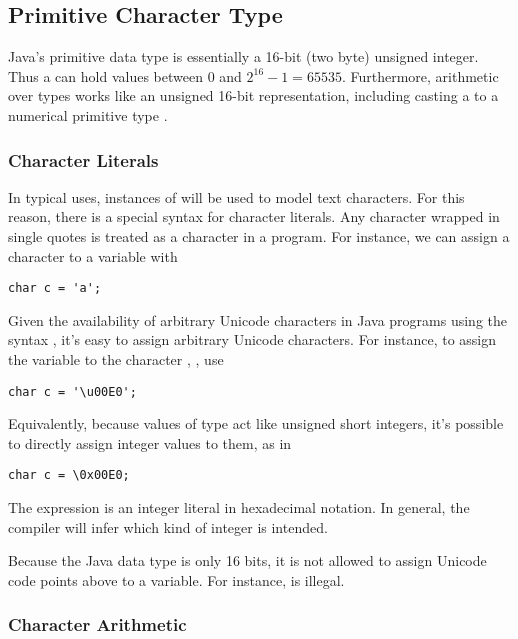 \subsection{Primitive Character Type}

Java's primitive  data type is essentially a 16-bit (two
byte) unsigned integer. Thus a  can hold values between 0
and $2^16-1 = 65535$.  Furthermore, arithmetic over  types
works like an unsigned 16-bit representation, including casting a
 to a numerical primitive type .

\subsubsection{Character Literals}

In typical uses, instances of  will be used to model text
characters.  For this reason, there is a special syntax for character
literals.  Any character wrapped in single quotes is treated as
a character in a program.  For instance, we can assign a character
to a variable with 
%
\begin{verbatim}
char c = 'a'; 
\end{verbatim}
%
Given the availability of arbitrary Unicode characters in Java
programs using the syntax , it's easy
to assign arbitrary Unicode characters.  For instance, 
to assign the variable  to the character ,
, use
%
\begin{verbatim}
char c = '\u00E0'; 
\end{verbatim}
%
Equivalently, because values of type  act like unsigned
short integers, it's possible to directly assign integer values
to them, as in
%
\begin{verbatim}
char c = \0x00E0;
\end{verbatim}
%
The expression  is an integer literal in hexadecimal
notation.  In general, the compiler will infer which kind of integer
is intended.  

Because the Java  data type is only 16 bits, it is not
allowed to assign Unicode code points above  to a
 variable.  For instance,  is illegal.



\subsubsection{Character Arithmetic}

